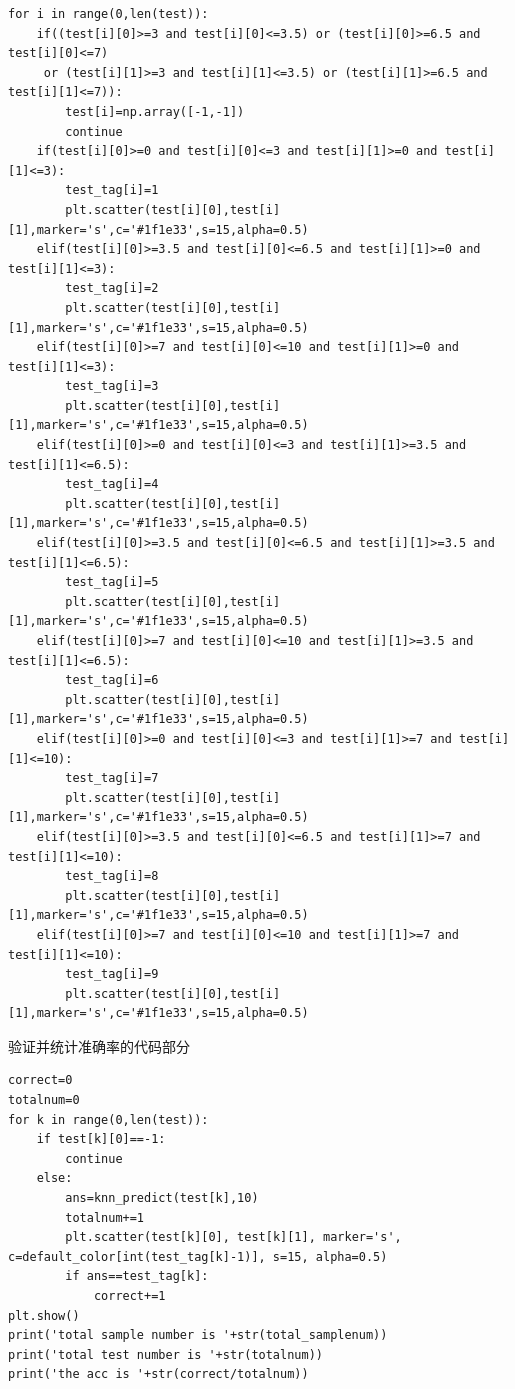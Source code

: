 \documentclass{article}
\begin{document}
\begin{verbatim}
for i in range(0,len(test)):
    if((test[i][0]>=3 and test[i][0]<=3.5) or (test[i][0]>=6.5 and test[i][0]<=7)
     or (test[i][1]>=3 and test[i][1]<=3.5) or (test[i][1]>=6.5 and test[i][1]<=7)):
        test[i]=np.array([-1,-1])
        continue
    if(test[i][0]>=0 and test[i][0]<=3 and test[i][1]>=0 and test[i][1]<=3):
        test_tag[i]=1
        plt.scatter(test[i][0],test[i][1],marker='s',c='#1f1e33',s=15,alpha=0.5)
    elif(test[i][0]>=3.5 and test[i][0]<=6.5 and test[i][1]>=0 and test[i][1]<=3):
        test_tag[i]=2
        plt.scatter(test[i][0],test[i][1],marker='s',c='#1f1e33',s=15,alpha=0.5)
    elif(test[i][0]>=7 and test[i][0]<=10 and test[i][1]>=0 and test[i][1]<=3):
        test_tag[i]=3
        plt.scatter(test[i][0],test[i][1],marker='s',c='#1f1e33',s=15,alpha=0.5)
    elif(test[i][0]>=0 and test[i][0]<=3 and test[i][1]>=3.5 and test[i][1]<=6.5):
        test_tag[i]=4
        plt.scatter(test[i][0],test[i][1],marker='s',c='#1f1e33',s=15,alpha=0.5)
    elif(test[i][0]>=3.5 and test[i][0]<=6.5 and test[i][1]>=3.5 and test[i][1]<=6.5):
        test_tag[i]=5
        plt.scatter(test[i][0],test[i][1],marker='s',c='#1f1e33',s=15,alpha=0.5)
    elif(test[i][0]>=7 and test[i][0]<=10 and test[i][1]>=3.5 and test[i][1]<=6.5):
        test_tag[i]=6
        plt.scatter(test[i][0],test[i][1],marker='s',c='#1f1e33',s=15,alpha=0.5)
    elif(test[i][0]>=0 and test[i][0]<=3 and test[i][1]>=7 and test[i][1]<=10):
        test_tag[i]=7
        plt.scatter(test[i][0],test[i][1],marker='s',c='#1f1e33',s=15,alpha=0.5)
    elif(test[i][0]>=3.5 and test[i][0]<=6.5 and test[i][1]>=7 and test[i][1]<=10):
        test_tag[i]=8
        plt.scatter(test[i][0],test[i][1],marker='s',c='#1f1e33',s=15,alpha=0.5)
    elif(test[i][0]>=7 and test[i][0]<=10 and test[i][1]>=7 and test[i][1]<=10):
        test_tag[i]=9
        plt.scatter(test[i][0],test[i][1],marker='s',c='#1f1e33',s=15,alpha=0.5)
\end{verbatim}

\noindent 验证并统计准确率的代码部分
\begin{verbatim}
correct=0
totalnum=0
for k in range(0,len(test)):
    if test[k][0]==-1:
        continue
    else:
        ans=knn_predict(test[k],10)
        totalnum+=1
        plt.scatter(test[k][0], test[k][1], marker='s', c=default_color[int(test_tag[k]-1)], s=15, alpha=0.5)
        if ans==test_tag[k]:
            correct+=1
plt.show()
print('total sample number is '+str(total_samplenum))
print('total test number is '+str(totalnum))    
print('the acc is '+str(correct/totalnum))
\end{verbatim}
\end{document}
